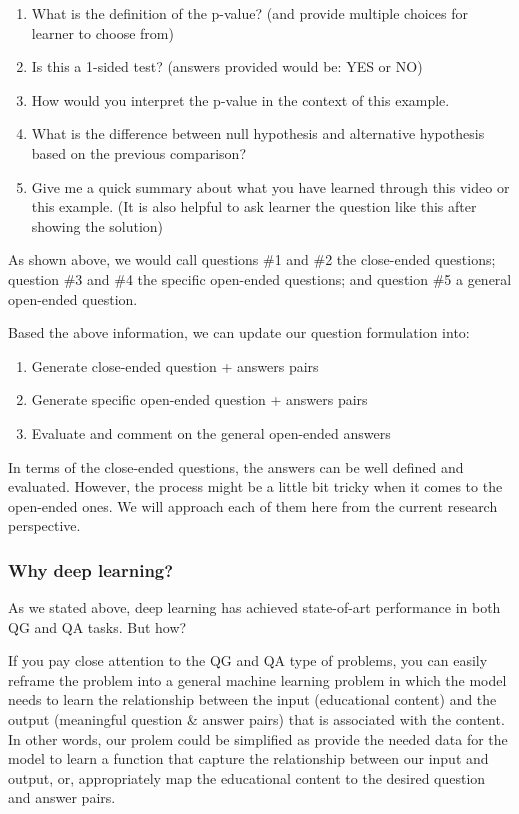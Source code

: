 \documentclass{acm_proc_article-sp}
\begin{document}
\begin{enumerate}
\def\labelenumi{\arabic{enumi}.}
\item
  What is the definition of the p-value? (and provide multiple choices
  for learner to choose from)
\item
  Is this a 1-sided test? (answers provided would be: YES or NO)
\item
  How would you interpret the p-value in the context of this example.
\item
  What is the difference between null hypothesis and alternative
  hypothesis based on the previous comparison?
\item
  Give me a quick summary about what you have learned through this video
  or this example. (It is also helpful to ask learner the question like
  this after showing the solution)
\end{enumerate}

As shown above, we would call questions \#1 and \#2 the close-ended
questions; question \#3 and \#4 the specific open-ended questions; and
question \#5 a general open-ended question.

Based the above information, we can update our question formulation
into:

\begin{enumerate}
\def\labelenumi{\arabic{enumi}.}
\item
  Generate close-ended question + answers pairs
\item
  Generate specific open-ended question + answers pairs
\item
  Evaluate and comment on the general open-ended answers
\end{enumerate}

In terms of the close-ended questions, the answers can be well defined
and evaluated. However, the process might be a little bit tricky when it
comes to the open-ended ones. We will approach each of them here from
the current research perspective.

\subsubsection{Why deep learning?}\label{why-deep-learning}

As we stated above, deep learning has achieved state-of-art performance
in both QG and QA tasks. But how?

If you pay close attention to the QG and QA type of problems, you can
easily reframe the problem into a general machine learning problem in
which the model needs to learn the relationship between the input
(educational content) and the output (meaningful question \& answer
pairs) that is associated with the content. In other words, our prolem
could be simplified as provide the needed data for the model to learn a
function that capture the relationship between our input and output, or,
appropriately map the educational content to the desired question and
answer pairs.
\end{document}
